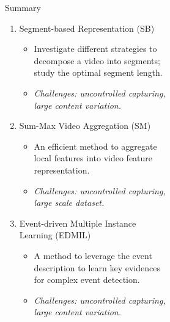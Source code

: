 \documentclass{beamer}
\begin{document}
	

\begin{frame}[t]{Summary}
	
	\begin{enumerate}
		\item \small{Segment-based Representation (SB)}
		\begin{itemize}
			\item \small{Investigate different strategies to \\
				decompose a video into segments; \\
				study the optimal segment length.}
			\item \textit{Challenges: uncontrolled capturing, 
				\\large content variation.}
		\end{itemize}
		\item Sum-Max Video Aggregation (SM)
		\begin{itemize}
			\item An efficient method to aggregate\\
			local features into video feature \\
			representation.
			\item \textit{Challenges: uncontrolled capturing,
				\\ large scale dataset.}
		\end{itemize}
		\item Event-driven Multiple Instance \\
		Learning (EDMIL)
		\begin{itemize}
			\item A method to leverage the event\\
			description to learn key evidences \\
			for complex event detection.
			\item \textit{Challenges: uncontrolled capturing, 
				\\large content variation.}
		\end{itemize}
	\end{enumerate}
	

\end{frame}
\end{document}
